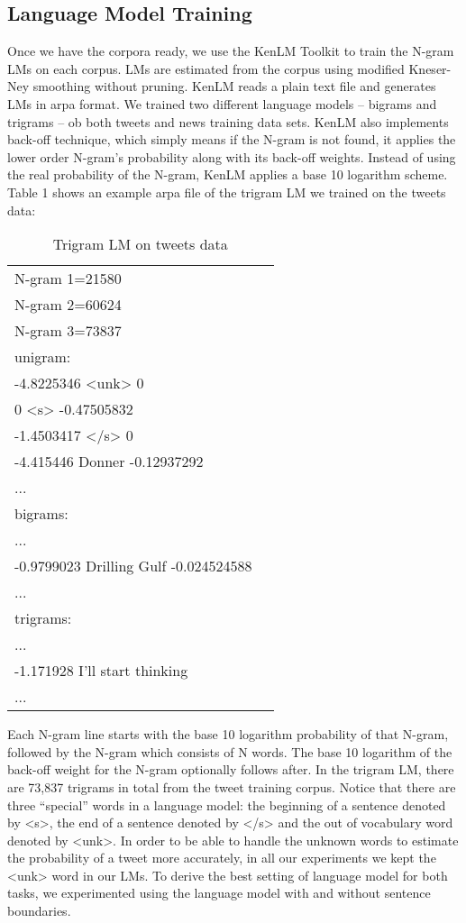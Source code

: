 \documentclass[11pt,a4paper]{article}
\begin{document}
\subsection{Language Model Training}
Once we have the corpora ready, we use the KenLM Toolkit to train the N-gram LMs on each corpus. LMs are estimated from the corpus using modified Kneser-Ney smoothing without pruning. KenLM reads a plain text file and generates LMs in arpa format. We trained two different language models -- bigrams and trigrams -- ob both tweets and news training data sets. KenLM also implements back-off technique, which simply means if the N-gram is not found, it applies the lower order N-gram's probability along with its back-off weights. Instead of using the real probability of the N-gram, KenLM applies a base 10 logarithm scheme. Table 1 shows an example arpa file of the trigram LM we trained on the tweets data:

\begin{table}[h!]
\begin{tabular}{ |l |c|}
\hline
N-gram 1=21580 \\
N-gram 2=60624 \\
N-gram 3=73837 \\
\hline
unigram:\\
-4.8225346   \textless unk\textgreater{}   0 \\
0   \textless s\textgreater{}   -0.47505832 \\
-1.4503417   \textless /s\textgreater{}   0 \\
-4.415446   Donner  -0.12937292 \\
...\\
\hline
bigrams:\\
...\\
-0.9799023  Drilling Gulf -0.024524588\\
...\\
\hline
trigrams:\\
...\\
-1.171928 I'll start thinking\\
...\\
\hline
\end{tabular}
\caption{Trigram LM on tweets data}
\label{table:1}
\end{table}
\indent
Each N-gram line starts with the base 10 logarithm probability of that N-gram, followed by the N-gram which consists of N words. The base 10 logarithm of the back-off weight for the N-gram optionally follows after. In the trigram LM, there are 73,837 trigrams in total from the tweet training corpus. Notice that there are three ``special'' words in a language model: the beginning of a sentence denoted by \textless s\textgreater, the end of a sentence denoted by \textless /s\textgreater{} and the out of vocabulary word denoted by \textless unk\textgreater. In order to be able to handle the unknown words to estimate the probability of a tweet more accurately, in all our experiments we kept the \textless unk\textgreater{} word in our LMs. To derive the best setting of language model for both tasks, we experimented using the language model with and without sentence boundaries.
\end{document}
